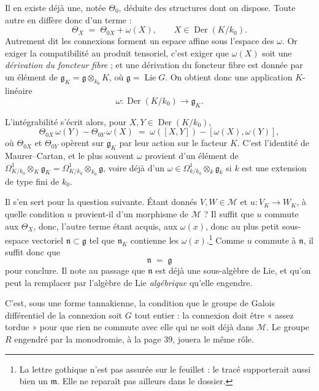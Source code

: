 \documentclass[11pt,a4paper]{article}
\begin{document}
Il en existe déjà une, notée $\Theta_{0}$, déduite des structures dont on
dispose. Toute autre en diffère donc d'un terme :
\[
\Theta_{X} \;=\; \Theta_{0X} + \omega(X) , \qquad X \in \operatorname{Der}(K/k_{0}) .
\]
Autrement dit les connexions forment un espace affine sous l'espace des
$\omega$. Or exiger la compatibilité au produit tensoriel, c'est exiger que
$\omega(X)$ soit une \emph{dérivation du foncteur fibre} ; et une dérivation du
foncteur fibre est donnée par un élément de $\mathfrak{g}_{K} = \mathfrak{g}
\otimes_{k_{0}} K$, où $\mathfrak{g} = \operatorname{Lie} G$. On obtient donc une
application $K$-linéaire
\[
\omega : \operatorname{Der}(K/k_{0}) \longrightarrow \mathfrak{g}_{K} .
\]

L'intégrabilité s'écrit alors, pour $X, Y \in \operatorname{Der}(K/k_{0})$,
\[
\Theta_{0X}\, \omega(Y) - \Theta_{0Y}\, \omega(X) \;=\; \omega([X,Y]) - [\omega(X), \omega(Y)] ,
\]
où $\Theta_{0X}$ et $\Theta_{0Y}$ opèrent sur $\mathfrak{g}_{K}$ par leur action
sur le facteur $K$. C'est l'identité de Maurer--Cartan, et le plus souvent
$\omega$ provient d'un élément de $\Omega^{1}_{K/k_{0}} \otimes_{K}
\mathfrak{g}_{K} = \Omega^{1}_{K/k_{0}} \otimes_{k_{0}} \mathfrak{g}$, voire
déjà d'un $\omega \in \Omega^{1}_{k/k_{0}} \otimes_{k} \mathfrak{g}_{k}$ si $k$
est une extension de type fini de $k_{0}$.

Il s'en sert pour la question suivante. Étant donnés $V, W \in \mathcal{M}$ et
$u : V_{K} \to W_{K}$, à quelle condition $u$ provient-il d'un morphisme de
$\mathcal{M}$ ? Il suffit que $u$ commute aux $\Theta_{X}$, donc, l'autre
terme étant acquis, aux $\omega(x)$, donc au plus petit sous-espace vectoriel
$\mathfrak{n} \subset \mathfrak{g}$ tel que $\mathfrak{n}_{K}$ contienne les
$\omega(x)$.\footnote{La lettre gothique n'est pas assurée sur le feuillet : le
tracé supporterait aussi bien un $\mathfrak{m}$. Elle ne reparaît pas ailleurs
dans le dossier.} Comme $u$ commute à $\mathfrak{n}$, il suffit donc que
\[
\mathfrak{n} \;=\; \mathfrak{g}
\]
pour conclure. Il note au passage que $\mathfrak{n}$ est déjà une sous-algèbre
de Lie, et qu'on peut la remplacer par l'algèbre de Lie \emph{algébrique}
qu'elle engendre.

C'est, sous une forme tannakienne, la condition que le groupe de Galois
différentiel de la connexion soit $G$ tout entier : la connexion doit être
« assez tordue » pour que rien ne commute avec elle qui ne soit déjà dans
$\mathcal{M}$. Le groupe $R$ engendré par la monodromie, à la page 39, jouera le
même rôle.
\end{document}
